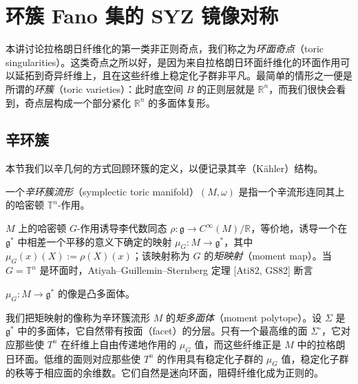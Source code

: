 
\section{环簇 Fano 集的 SYZ 镜像对称}

本讲讨论拉格朗日纤维化的第一类非正则奇点，我们称之为\emph{环面奇点}（toric singularities）。这类奇点之所以好，是因为来自拉格朗日环面纤维化的环面作用可以延拓到奇异纤维上，且在这些纤维上稳定化子群非平凡。最简单的情形之一便是所谓的\emph{环簇}（toric varieties）：此时底空间 $B$ 的正则层就是 $\mathbb{R}^n$，而我们很快会看到，奇点层构成一个部分紧化 $\mathbb{R}^n$ 的多面体复形。


\subsection{辛环簇}

本节我们以辛几何的方式回顾环簇的定义，以便记录其辛（Kähler）结构。

\begin{definition*}
一个\emph{辛环簇流形}（symplectic toric manifold）$(M,\omega)$ 是指一个辛流形连同其上的哈密顿 $\mathbb{T}^n$-作用。
\end{definition*}

$M$ 上的哈密顿 $G$-作用诱导李代数同态 $\rho\colon\mathfrak{g}\to C^{\infty} (M)/\mathbb{R}$，等价地，诱导一个在 $\mathfrak{g}^{\ast}$ 中相差一个平移的意义下确定的映射 $\mu_G\colon M\to\mathfrak{g}^{\ast}$，其中 $\mu_G(x)(X):=\rho (X)(x)$；该映射称为 $G$ 的\emph{矩映射}（moment map）。当 $G=\mathbb{T}^n$ 是环面时，Atiyah--Guillemin--Sternberg 定理 [Ati82, GS82] 断言

\begin{theorem*}
$\mu_G\colon M\to\mathfrak{g}^{\ast}$ 的像是凸多面体。
\end{theorem*}

我们把矩映射的像称为辛环簇流形 $M$ 的\emph{矩多面体}（moment polytope）。设 $\Sigma$ 是 $\mathfrak{g}^{\ast}$ 中的多面体，它自然带有按面（facet）的分层。只有一个最高维的面 $\Sigma^{\circ}$，它对应那些使 $T^n$ 在纤维上自由传递地作用的 $\mu_G$ 值，而这些纤维正是 $M$ 中的拉格朗日环面。低维的面则对应那些使 $T^n$ 的作用具有稳定化子群的 $\mu_G$ 值，稳定化子群的秩等于相应面的余维数。它们自然是迷向环面，阻碍纤维化成为正则的。

